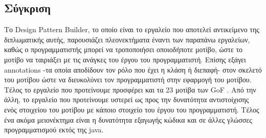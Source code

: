 \subsection{Σύγκριση}
\label{subsec:compare}
Το Design Pattern Builder, το οποίο είναι το εργαλείο που αποτελεί αντικείμενο της διπλωματικής αυτής, παρουσιάζει πλεονεκτήματα έναντι 
των παραπάνω εργαλείων,
καθώς ο προγραμματιστής μπορεί να τροποποιήσει οποιοδήποτε μοτίβο, ώστε το μοτίβο να ταιριάξει με τις ανάγκες του έργου του 
προγραμματιστή. 
Επίσης εξάγει annotations -τα οποία αποδίδουν τον ρόλο που έχει η κλάση ή διεπαφή-  στον σκελετό του μοτίβου ώστε 
να διευκολύνει τον προγραμματιστή στην εφαρμογή του μοτίβου. Τέλος το εργαλείο που προτείνουμε προσφέρει και τα 23 μοτίβα 
των GoF \cite{GoF}.
\linebreak
\linebreak
Από την άλλη, το εργαλείο που προτείνουμε υστερεί ως προς την δυνατότητα αντιστοίχισης 
ενός στοιχείου του μοτίβου με κάποιο στοιχείο του έργου του προγραμματιστή. Τέλος ένα ακόμα μειονέκτημα 
είναι η δυνατότητα εξαγωγής κώδικα και σε άλλες γλώσσες προγραμματισμού εκτός της java.
